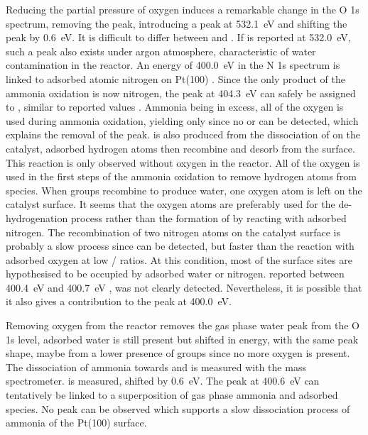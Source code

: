 Reducing the partial pressure of oxygen induces a remarkable change in the O 1s spectrum, removing the  peak, introducing a  peak at \qty{532.1}{\eV} and shifting the  peak by \qty{0.6}{\eV}.
It is difficult to differ between  and .
If  is reported at \qty{532.0}{\eV}, such a peak also exists under argon atmosphere, characteristic of water contamination in the reactor.
An energy of \qty{400.0}{\eV} in the N 1s spectrum is linked to adsorbed atomic nitrogen on Pt(100) \parencite{Sugai1993, vandenBroek1999}.
Since the only product of the ammonia oxidation is now nitrogen, the peak at \qty{404.3}{\eV} can safely be assigned to , similar to reported values \parencite{Ivashenko2021}.
Ammonia being in excess, all of the oxygen is used during ammonia oxidation, yielding only  since no  or  can be detected, which explains the removal of the  peak.
 is also produced from the dissociation of  on the catalyst, adsorbed hydrogen atoms then recombine and desorb from the surface.
This reaction is only observed without oxygen in the reactor.
All of the oxygen is used in the first steps of the ammonia oxidation to remove hydrogen atoms from  species.
When  groups recombine to produce water, one oxygen atom is left on the catalyst surface.
It seems that the oxygen atoms are preferably used for the de-hydrogenation process rather than the formation of  by reacting with adsorbed nitrogen.
The recombination of two nitrogen atoms on the catalyst surface is probably a slow process since  can be detected, but faster than the reaction with adsorbed oxygen at low / ratios.
At this condition, most of the surface sites are hypothesised to be occupied by adsorbed water or nitrogen.
 reported between \qty{400.4}{\eV} and \qty{400.7}{\eV} \parencite{Ivashenko2021}, was not clearly detected.
Nevertheless, it is possible that it also gives a contribution to the peak at \qty{400.0}{\eV}.

Removing oxygen from the reactor removes the gas phase water peak from the O 1s level, adsorbed water is still present but shifted in energy, with the same peak shape, maybe from a lower presence of  groups since no more oxygen is present.
The dissociation of ammonia towards  and  is measured with the mass spectrometer.
 is measured, shifted by \qty{0.6}{\eV}.
The peak at \qty{400.6}{\eV} can tentatively be linked to a superposition of gas phase ammonia and adsorbed  species.
No  peak can be observed which supports a slow dissociation process of ammonia of the Pt(100) surface.

